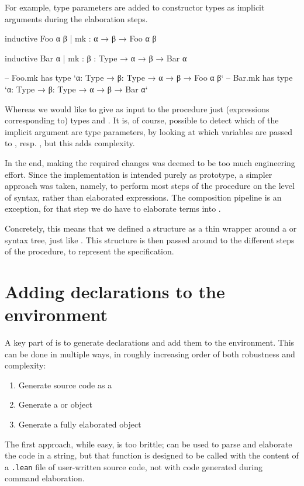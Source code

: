 For example, type parameters are added to constructor types as implicit arguments during the elaboration steps.
\begin{leancode}
    inductive Foo α β
      | mk : α → β → Foo α β

    inductive Bar α
      | mk : {β : Type} → α → β → Bar α

    -- Foo.mk has type `{α: Type} → {β: Type} → α → β → Foo α β`
    -- Bar.mk has type `{α: Type} → {β: Type} → α → β → Bar α`
\end{leancode}
Whereas we would like to give as input to the procedure just (expressions corresponding to) types  and .
It is, of course, possible to detect which of the implicit argument are type parameters, by looking at which variables are passed to , resp. , but this adds complexity.

In the end, making the required changes was deemed to be too much engineering effort. 
Since the implementation is intended purely as prototype, a simpler approach was taken, namely, to 
perform most steps of the procedure on the level of syntax, rather than elaborated expressions. 
The composition pipeline is an exception, for that step we do have to elaborate terms into .


Concretely, this means that we defined a  structure as a thin wrapper around a \data{} or \codata{} syntax tree, just like .
This structure is then passed around to the different steps of the procedure, to represent the specification.



\section{Adding declarations to the environment}
A key part of  is to generate declarations and add them to the environment.
This can be done in multiple ways, in roughly increasing order of both robustness and complexity:
\begin{enumerate}
    \item Generate source code as a 
    \item Generate a  or  object
    \item Generate a fully elaborated  object
\end{enumerate}

The first approach, while easy, is too brittle;  can be used to parse and elaborate the code in a string, but that function is designed to be called with the content of a \texttt{.lean} file of user-written source code, not with code generated during command elaboration.

